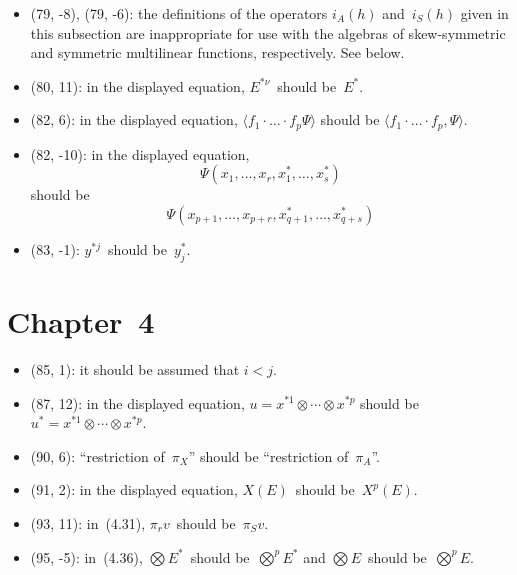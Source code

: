 \documentclass[letterpaper,12pt]{article}
\newcommand{\tprod}{\otimes}
\newcommand{\bigtprod}{\bigotimes}
\newcommand{\sprod}[2]{\langle#1,#2\rangle}
\begin{document}
\begin{itemize}
\item (79, -8), (79, -6): the definitions of the operators \(i_A(h)\) and~\(i_S(h)\) given in this subsection are inappropriate for use with the algebras of skew-symmetric and symmetric multilinear functions, respectively. See below.
\item (80, 11): in the displayed equation, \(E^{*\nu}\)~should be~\(E^*\).
\item (82, 6): in the displayed equation, \(\langle f_1\cdot\ldots\cdot f_p\Psi\rangle\) should be \(\sprod{f_1\cdot\ldots\cdot f_p}{\Psi}\).
\item (82, -10): in the displayed equation,
\[\Psi(x_1,\ldots,x_r,x^*_1,\ldots,x^*_s)\]
should be
\[\Psi(x_{p+1},\ldots,x_{p+r},x^*_{q+1},\ldots,x^*_{q+s})\]
\item (83, -1): \(y^{*j}\)~should be~\(y^*_j\).
\end{itemize}

\section*{Chapter~4}
\begin{itemize}
\item (85, 1): it should be assumed that \(i<j\).
\item (87, 12): in the displayed equation, \(u=x^{*1}\tprod\cdots\tprod x^{*p}\) should be \(u^*=x^{*1}\tprod\cdots\tprod x^{*p}\).
\item (90, 6): ``restriction of~\(\pi_X\)'' should be ``restriction of~\(\pi_A\)''.
\item (91, 2): in the displayed equation, \(X(E)\)~should be~\(X^p(E)\).
\item (93, 11): in~(4.31), \(\pi_r v\)~should be~\(\pi_S v\).
\item (95, -5): in~(4.36), \(\bigtprod E^*\)~should be~\(\bigtprod^p E^*\) and \(\bigtprod E\)~should be~\(\bigtprod^p E\).
\end{itemize}
\end{document}
